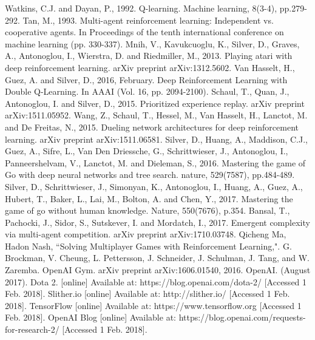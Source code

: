 \documentclass[conference]{IEEEtran}
\begin{document}
\begin{thebibliography}{00}
 Watkins, C.J. and Dayan, P., 1992. Q-learning. Machine learning, 8(3-4), pp.279-292.
 Tan, M., 1993. Multi-agent reinforcement learning: Independent vs. cooperative agents. In Proceedings of the tenth international conference on machine learning (pp. 330-337).
 Mnih, V., Kavukcuoglu, K., Silver, D., Graves, A., Antonoglou, I., Wierstra, D. and Riedmiller, M., 2013. Playing atari with deep reinforcement learning. arXiv preprint arXiv:1312.5602.
 Van Hasselt, H., Guez, A. and Silver, D., 2016, February. Deep Reinforcement Learning with Double Q-Learning. In AAAI (Vol. 16, pp. 2094-2100).
 Schaul, T., Quan, J., Antonoglou, I. and Silver, D., 2015. Prioritized experience replay. arXiv preprint arXiv:1511.05952.
 Wang, Z., Schaul, T., Hessel, M., Van Hasselt, H., Lanctot, M. and De Freitas, N., 2015. Dueling network architectures for deep reinforcement learning. arXiv preprint arXiv:1511.06581.
 Silver, D., Huang, A., Maddison, C.J., Guez, A., Sifre, L., Van Den Driessche, G., Schrittwieser, J., Antonoglou, I., Panneershelvam, V., Lanctot, M. and Dieleman, S., 2016. Mastering the game of Go with deep neural networks and tree search. nature, 529(7587), pp.484-489.
 Silver, D., Schrittwieser, J., Simonyan, K., Antonoglou, I., Huang, A., Guez, A., Hubert, T., Baker, L., Lai, M., Bolton, A. and Chen, Y., 2017. Mastering the game of go without human knowledge. Nature, 550(7676), p.354.
 Bansal, T., Pachocki, J., Sidor, S., Sutskever, I. and Mordatch, I., 2017. Emergent complexity via multi-agent competition. arXiv preprint arXiv:1710.03748.
 Qicheng Ma, Hadon Nash, ``Solving Multiplayer Games with Reinforcement Learning,".
 G. Brockman, V. Cheung, L. Pettersson, J. Schneider, J. Schulman, J. Tang, and W. Zaremba. OpenAI Gym. arXiv preprint arXiv:1606.01540, 2016.
 OpenAI. (August 2017). Dota 2. [online] Available at: https://blog.openai.com/dota-2/ [Accessed 1 Feb. 2018].
 Slither.io [online] Available at: http://slither.io/ [Accessed 1 Feb. 2018].
 TensorFlow [online] Available at: https://www.tensorflow.org [Accessed 1 Feb. 2018].
 OpenAI Blog [online] Available at: https://blog.openai.com/requests-for-research-2/ [Accessed 1 Feb. 2018].
\end{thebibliography}
\end{document}
